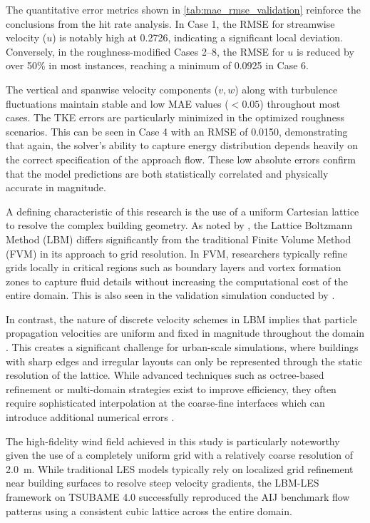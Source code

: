 The quantitative error metrics shown in \autoref{tab:mae_rmse_validation} reinforce the conclusions from the hit rate analysis. In Case 1, the RMSE for streamwise velocity ($u$) is notably high at 0.2726, indicating a significant local deviation. Conversely, in the roughness-modified Cases 2--8, the RMSE for $u$ is reduced by over 50\% in most instances, reaching a minimum of 0.0925 in Case 6. 

The vertical and spanwise velocity components ($v, w$) along with turbulence fluctuations maintain stable and low MAE values ($< 0.05$) throughout most cases. The TKE errors are particularly minimized in the optimized roughness scenarios. This can be seen in Case 4 with an RMSE of 0.0150, demonstrating that again, the solver's ability to capture energy distribution depends heavily on the correct specification of the approach flow. These low absolute errors confirm that the model predictions are both statistically correlated and physically accurate in magnitude.

A defining characteristic of this research is the use of a uniform Cartesian lattice to resolve the complex building geometry. As noted by \textcite{Hu2025}, the Lattice Boltzmann Method (LBM) differs significantly from the traditional Finite Volume Method (FVM) in its approach to grid resolution. In FVM, researchers typically refine grids locally in critical regions such as boundary layers and vortex formation zones to capture fluid details without increasing the computational cost of the entire domain. This is also seen in the validation simulation conducted by \textcite{Okaze2021LES}.

In contrast, the nature of discrete velocity schemes in LBM implies that particle propagation velocities are uniform and fixed in magnitude throughout the domain \parencite{Hu2025}. This creates a significant challenge for urban-scale simulations, where buildings with sharp edges and irregular layouts can only be represented through the static resolution of the lattice. While advanced techniques such as octree-based refinement or multi-domain strategies exist to improve efficiency, they often require sophisticated interpolation at the coarse-fine interfaces which can introduce additional numerical errors \parencite{Hu2025}.

The high-fidelity wind field achieved in this study is particularly noteworthy given the use of a completely uniform grid with a relatively coarse resolution of 2.0~m. While traditional LES models typically rely on localized grid refinement near building surfaces to resolve steep velocity gradients, the LBM-LES framework on TSUBAME 4.0 successfully reproduced the AIJ benchmark flow patterns using a consistent cubic lattice across the entire domain. 

